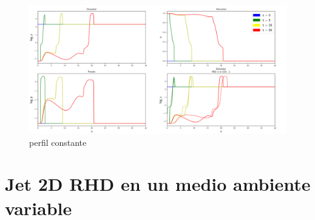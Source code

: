 \documentclass[12pt,a4paper]{book}
\begin{document}
\begin{figure}
  \centering
  \includegraphics[width = 1.0\textwidth]{./Figuras/jet/perfiles/perfiles_constantes.png}
  \caption{{\color{red} perfil constante}}\label{fig:Decaimiento_constante_densidad_jet}
\end{figure}


\section{Jet 2D RHD en un medio ambiente variable}
\end{document}
